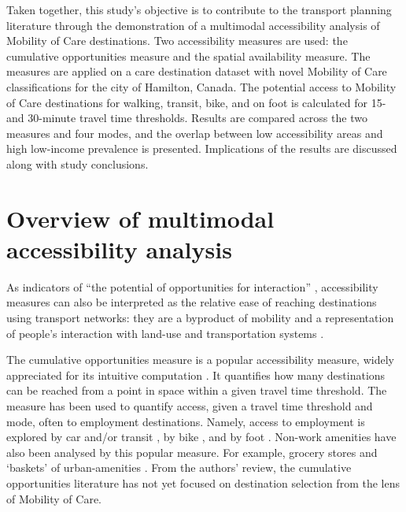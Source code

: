 \documentclass[
  authoryear,
  preprint,
  3p]{elsarticle}
\begin{document}
Taken together, this study's objective is to contribute to the transport
planning literature through the demonstration of a multimodal
accessibility analysis of Mobility of Care destinations. Two
accessibility measures are used: the cumulative opportunities measure
and the spatial availability measure. The measures are applied on a care
destination dataset with novel Mobility of Care classifications for the
city of Hamilton, Canada. The potential access to Mobility of Care
destinations for walking, transit, bike, and on foot is calculated for
15- and 30-minute travel time thresholds. Results are compared across
the two measures and four modes, and the overlap between low
accessibility areas and high low-income prevalence is presented.
Implications of the results are discussed along with study conclusions.

\section{Overview of multimodal accessibility
analysis}\label{overview-of-multimodal-accessibility-analysis}

As indicators of ``the potential of opportunities for interaction''
\citep{hansenHowAccessibilityShapes1959}, accessibility measures can
also be interpreted as the relative ease of reaching destinations using
transport networks: they are a byproduct of mobility and a
representation of people's interaction with land-use and transportation
systems
\citep{hansenHowAccessibilityShapes1959, handyAccessibilityIdeaWhose2020, elgeneidyMakingAccessibilityWork2021}.

The cumulative opportunities measure is a popular accessibility measure,
widely appreciated for its intuitive computation
\citep{handyAccessibilityIdeaWhose2020, handyMeasuringAccessibilityExploration1997, kelobonyeRelativeAccessibilityAnalysis2019, chengInvestigatingWalkingAccessibility2019}.
It quantifies how many destinations can be reached from a point in space
within a given travel time threshold. The measure has been used to
quantify access, given a travel time threshold and mode, often to
employment destinations. Namely, access to employment is explored by car
and/or transit
\citep{kapatsilaResolvingAccessibilityDilemma2023, deboosereEvaluatingEquityAccessibility2018, tomasiello2023time},
by bike \citep{imani2019cycle}, and by foot \citep{singh2022cumulative}.
Non-work amenities have also been analysed by this popular measure. For
example, grocery stores \citep{hosford15minuteCityReach2022} and
`baskets' of urban-amenities
\citep{mccahill2018non, klumpenhouwer2021flexible, chengInvestigatingWalkingAccessibility2019}.
From the authors' review, the cumulative opportunities literature has
not yet focused on destination selection from the lens of Mobility of
Care.
\end{document}
